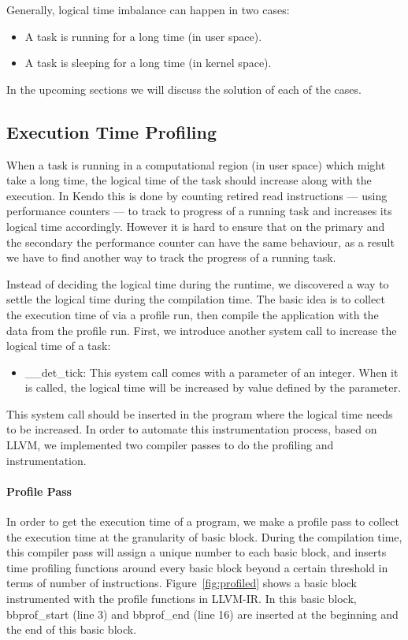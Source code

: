 Generally, logical time imbalance can happen in two cases:
\begin{itemize}
  \item A task is running for a long time (in user space).
  \item A task is sleeping for a long time (in kernel space).
\end{itemize}

In the upcoming sections we will discuss the solution of each of the cases.
\subsection{Execution Time Profiling}
When a task is running in a computational region (in user space) which might take a long time, the logical time of the task should increase along with the execution. In Kendo this is done by counting retired read instructions — using performance counters — to track to progress of a running task and increases its logical time accordingly. However it is hard to ensure that on the primary and the secondary the performance counter can have the same behaviour, as a result we have to find another way to track the progress of a running task.

Instead of deciding the logical time during the runtime, we discovered a way to settle the logical time during the compilation time. The basic idea is to collect the execution time of via a profile run, then compile the application with the data from the profile run. First, we introduce another system call to increase the logical time of a task:

\begin{itemize}
   \item \_\_det\_tick: This system call comes with a parameter of an integer. When it is called, the logical time will be increased by value defined by the parameter.
\end{itemize}

This system call should be inserted in the program where the logical time needs to be increased. In order to automate this instrumentation process, based on LLVM, we implemented two compiler passes to do the profiling and instrumentation.

\paragraph{Profile Pass}
In order to get the execution time of a program, we make a profile pass to collect the execution time at the granularity of basic block. During the compilation time, this compiler pass will assign a unique number to each basic block, and inserts time profiling functions around every basic block beyond a certain threshold in terms of number of instructions. Figure~\ref{fig:profiled} shows a basic block instrumented with the profile functions in LLVM-IR. In this basic block, bbprof\_start (line 3) and bbprof\_end (line 16) are inserted at the beginning and the end of this basic block.

